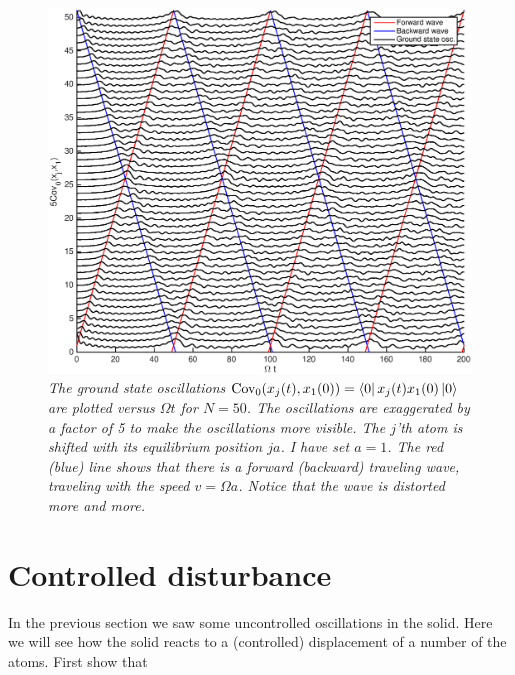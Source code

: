 \documentclass[10pt]{article}
\begin{document}
\begin{figure}
\includegraphics[width=1\textwidth]{ground_state_osc.eps} 
\caption{\textsl{The ground state oscillations $\text{Cov}_0(x_j(t),x_1(0))=\bra{0} x_j(t)x_1(0)\ket{0}$ are plotted versus $\Omega t$ for $N = 50$. The oscillations are exaggerated by a factor of 5 to make the oscillations more visible. The $j$'th atom is shifted with its equilibrium position $ja$. I have set $a=1$. The red (blue) line shows that there is a forward (backward) traveling wave, traveling with the speed $v=\Omega a$. Notice that the wave is distorted more and more. }}
\label{fig.ground_state_osc} 
\end{figure} 


\section{Controlled disturbance}
In the previous section we saw some uncontrolled oscillations in the solid. Here we will see how the solid reacts to a (controlled) displacement of a number of the atoms. First show that
\end{document}
